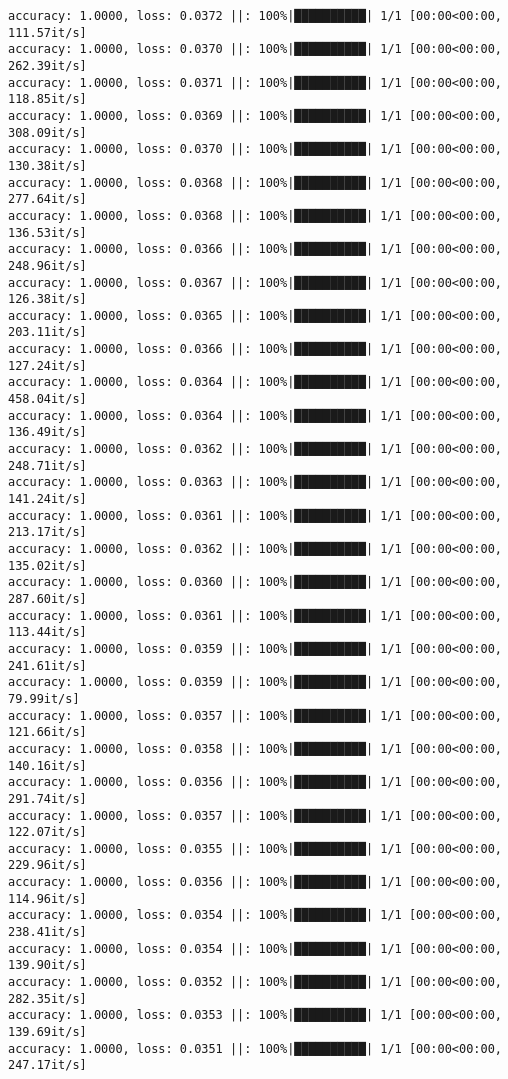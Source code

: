 \documentclass[
]{article}
\begin{document}
\begin{verbatim}
accuracy: 1.0000, loss: 0.0372 ||: 100%|██████████| 1/1 [00:00<00:00, 111.57it/s]
accuracy: 1.0000, loss: 0.0370 ||: 100%|██████████| 1/1 [00:00<00:00, 262.39it/s]
accuracy: 1.0000, loss: 0.0371 ||: 100%|██████████| 1/1 [00:00<00:00, 118.85it/s]
accuracy: 1.0000, loss: 0.0369 ||: 100%|██████████| 1/1 [00:00<00:00, 308.09it/s]
accuracy: 1.0000, loss: 0.0370 ||: 100%|██████████| 1/1 [00:00<00:00, 130.38it/s]
accuracy: 1.0000, loss: 0.0368 ||: 100%|██████████| 1/1 [00:00<00:00, 277.64it/s]
accuracy: 1.0000, loss: 0.0368 ||: 100%|██████████| 1/1 [00:00<00:00, 136.53it/s]
accuracy: 1.0000, loss: 0.0366 ||: 100%|██████████| 1/1 [00:00<00:00, 248.96it/s]
accuracy: 1.0000, loss: 0.0367 ||: 100%|██████████| 1/1 [00:00<00:00, 126.38it/s]
accuracy: 1.0000, loss: 0.0365 ||: 100%|██████████| 1/1 [00:00<00:00, 203.11it/s]
accuracy: 1.0000, loss: 0.0366 ||: 100%|██████████| 1/1 [00:00<00:00, 127.24it/s]
accuracy: 1.0000, loss: 0.0364 ||: 100%|██████████| 1/1 [00:00<00:00, 458.04it/s]
accuracy: 1.0000, loss: 0.0364 ||: 100%|██████████| 1/1 [00:00<00:00, 136.49it/s]
accuracy: 1.0000, loss: 0.0362 ||: 100%|██████████| 1/1 [00:00<00:00, 248.71it/s]
accuracy: 1.0000, loss: 0.0363 ||: 100%|██████████| 1/1 [00:00<00:00, 141.24it/s]
accuracy: 1.0000, loss: 0.0361 ||: 100%|██████████| 1/1 [00:00<00:00, 213.17it/s]
accuracy: 1.0000, loss: 0.0362 ||: 100%|██████████| 1/1 [00:00<00:00, 135.02it/s]
accuracy: 1.0000, loss: 0.0360 ||: 100%|██████████| 1/1 [00:00<00:00, 287.60it/s]
accuracy: 1.0000, loss: 0.0361 ||: 100%|██████████| 1/1 [00:00<00:00, 113.44it/s]
accuracy: 1.0000, loss: 0.0359 ||: 100%|██████████| 1/1 [00:00<00:00, 241.61it/s]
accuracy: 1.0000, loss: 0.0359 ||: 100%|██████████| 1/1 [00:00<00:00, 79.99it/s]
accuracy: 1.0000, loss: 0.0357 ||: 100%|██████████| 1/1 [00:00<00:00, 121.66it/s]
accuracy: 1.0000, loss: 0.0358 ||: 100%|██████████| 1/1 [00:00<00:00, 140.16it/s]
accuracy: 1.0000, loss: 0.0356 ||: 100%|██████████| 1/1 [00:00<00:00, 291.74it/s]
accuracy: 1.0000, loss: 0.0357 ||: 100%|██████████| 1/1 [00:00<00:00, 122.07it/s]
accuracy: 1.0000, loss: 0.0355 ||: 100%|██████████| 1/1 [00:00<00:00, 229.96it/s]
accuracy: 1.0000, loss: 0.0356 ||: 100%|██████████| 1/1 [00:00<00:00, 114.96it/s]
accuracy: 1.0000, loss: 0.0354 ||: 100%|██████████| 1/1 [00:00<00:00, 238.41it/s]
accuracy: 1.0000, loss: 0.0354 ||: 100%|██████████| 1/1 [00:00<00:00, 139.90it/s]
accuracy: 1.0000, loss: 0.0352 ||: 100%|██████████| 1/1 [00:00<00:00, 282.35it/s]
accuracy: 1.0000, loss: 0.0353 ||: 100%|██████████| 1/1 [00:00<00:00, 139.69it/s]
accuracy: 1.0000, loss: 0.0351 ||: 100%|██████████| 1/1 [00:00<00:00, 247.17it/s]

\end{verbatim}
\end{document}
